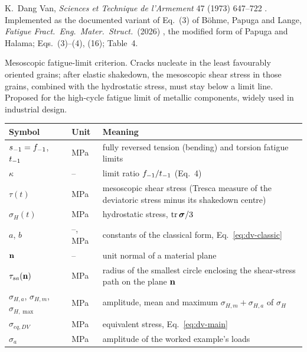 \label{sheet:DANGVAN}

 K.~Dang Van, \emph{Sciences et Technique de l'Armement} 47 (1973) 647--722
\cite{dangvan1973}. Implemented as the documented variant of Eq.~(3) of B\"ohme, Papuga and Lange,
\emph{Fatigue Fract.\ Eng.\ Mater.\ Struct.}\ (2026) \cite{bohme2026}, the modified form of Papuga and
Halama; Eqs.~(3)--(4), (16); Table~4.

 Mesoscopic fatigue-limit criterion. Cracks nucleate in the least favourably
oriented grains; after elastic shakedown, the mesoscopic shear stress in those grains, combined with
the hydrostatic stress, must stay below a limit line. Proposed for the high-cycle fatigue limit of
metallic components, widely used in industrial design.

\begin{center}\small
\begin{tabular}{@{}llp{100mm}@{}}
\toprule
Symbol & Unit & Meaning\\\midrule
$s_{-1}=f_{-1}$, $t_{-1}$ & MPa & fully reversed tension (bending) and torsion fatigue limits\\
$\kappa$ & -- & limit ratio $f_{-1}/t_{-1}$ (Eq.~4)\\
$\tau(t)$ & MPa & mesoscopic shear stress (Tresca measure of the deviatoric stress minus its shakedown centre)\\
$\sigma_H(t)$ & MPa & hydrostatic stress, $\operatorname{tr}\boldsymbol\sigma/3$\\
$a$, $b$ & --, MPa & constants of the classical form, Eq.~\eqref{eq:dv-classic}\\
$\mathbf n$ & -- & unit normal of a material plane\\
$\tau_{sa}(\mathbf n)$ & MPa & radius of the smallest circle enclosing the shear-stress path on the plane $\mathbf n$\\
$\sigma_{H,a}$, $\sigma_{H,m}$, $\sigma_{H,\max}$ & MPa & amplitude, mean and maximum $\sigma_{H,m}+\sigma_{H,a}$ of $\sigma_H$\\
$\sigma_{eq,DV}$ & MPa & equivalent stress, Eq.~\eqref{eq:dv-main}\\
$\sigma_a$ & MPa & amplitude of the worked example's loads\\
\bottomrule
\end{tabular}
\end{center}

